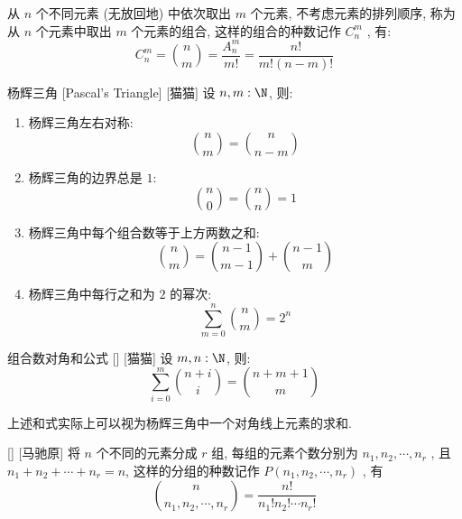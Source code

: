 \documentclass[UTF8]{ctexart}
\begin{document}
        \begin{prf}
            从 \(n\) 个不同元素 (无放回地) 中依次取出 \(m\) 个元素, 不考虑元素的排列顺序, 称为从 \(n\) 个元素中取出 \(m\) 个元素的组合, 这样的组合的种数记作 \(C_n^m\) , 有: 
            \[C_n^m=\binom{n}{m}=\frac{A_n^m}{m!}=\frac{n!}{m!(n-m)!}\]
        \end{prf}

        \begin{ppt}
            []
            {杨辉三角}
            [Pascal's Triangle]
            [猫猫]
            设 \(n, m:\N\), 则:
            \begin{enumerate}
                \item 杨辉三角左右对称: 
                    \[\binom{n}{m}=\binom{n}{n-m}\]
                \item 杨辉三角的边界总是 \(1\): 
                    \[\binom{n}{0}=\binom{n}{n}=1\]
                \item 杨辉三角中每个组合数等于上方两数之和: 
                    \[\binom{n}{m}=\binom{n-1}{m-1}+\binom{n-1}{m}\]
                \item 杨辉三角中每行之和为 \(2\) 的幂次:
                    \[\sum_{m=0}^{n}\binom{n}{m}=2^n\]
            \end{enumerate}
        \end{ppt}

        \begin{ppt}
            []
            {组合数对角和公式}
            []
            [猫猫]
            设 \(m, n:\N\), 则:
            \[\sum_{i=0}^{m}\binom{n+i}{i}=\binom{n+m+1}{m}\]
        \end{ppt}

        \begin{rmk}
            [猫猫]
            上述和式实际上可以视为杨辉三角中一个对角线上元素的求和. 
        \end{rmk}

        \begin{xmp}
            []
            {}
            []
            [马驰原]
            将 \(n\) 个不同的元素分成 \(r\) 组, 每组的元素个数分别为 \(n_1,n_2,\cdots,n_r\) , 且 \(n_1+n_2+\cdots+n_r=n\), 这样的分组的种数记作 \(P(n_1,n_2,\cdots,n_r)\) , 有
            \[\binom{n}{n_1,n_2,\cdots,n_r}=\frac{n!}{n_1!n_2!\cdots n_r!}\]
        \end{xmp}
    
        
\end{document}
